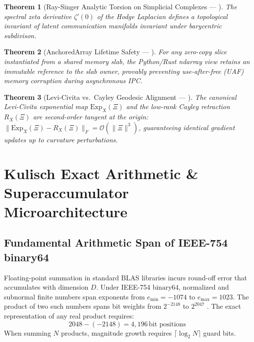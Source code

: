 \documentclass[journal,10pt,compsoc]{IEEEtran}
\theoremstyle{plain}
\newtheorem{theorem}{Theorem}
\theoremstyle{definition}
\begin{document}
\begin{theorem}[Ray-Singer Analytic Torsion on Simplicial Complexes --- \label{thm:polydim_0440}]
The spectral zeta derivative $\zeta'(0)$ of the Hodge Laplacian defines a topological invariant of latent communication manifolds invariant under barycentric subdivison.
\end{theorem}

\begin{theorem}[AnchoredArray Lifetime Safety --- \label{thm:polydim_0691}]
For any zero-copy slice instantiated from a shared memory slab, the Python/Rust ndarray view retains an immutable reference to the slab owner, provably preventing use-after-free (UAF) memory corruption during asynchronous IPC.
\end{theorem}

\begin{theorem}[Levi-Civita vs.\ Cayley Geodesic Alignment --- \label{thm:polydim_0880}]
The canonical Levi-Civita exponential map $\mathrm{Exp}_X(\Xi)$ and the low-rank Cayley retraction $R_X(\Xi)$ are second-order tangent at the origin: $\| \mathrm{Exp}_X(\Xi) - R_X(\Xi) \|_F = \mathcal{O}(\|\Xi\|^3)$, guaranteeing identical gradient updates up to curvature perturbations.
\end{theorem}

\section{Kulisch Exact Arithmetic \& Superaccumulator Microarchitecture}
\label{sec:kulisch}

\subsection{Fundamental Arithmetic Span of IEEE-754 binary64}
Floating-point summation in standard BLAS libraries incurs round-off error that accumulates with dimension $D$. Under IEEE-754 $\mathrm{binary64}$, normalized and subnormal finite numbers span exponents from $e_{\min} = -1074$ to $e_{\max} = 1023$. The product of two such numbers spans bit weights from $2^{-2148}$ to $2^{2047}$ \cite{kulisch2002advanced, kulisch2013computer}.
The exact representation of any real product requires:
\begin{equation}
\label{eq:span}
2048 - (-2148) = 4{,}196\,\text{bit positions}
\end{equation}
When summing $N$ products, magnitude growth requires $\lceil \log_2 N \rceil$ guard bits.
\end{document}
